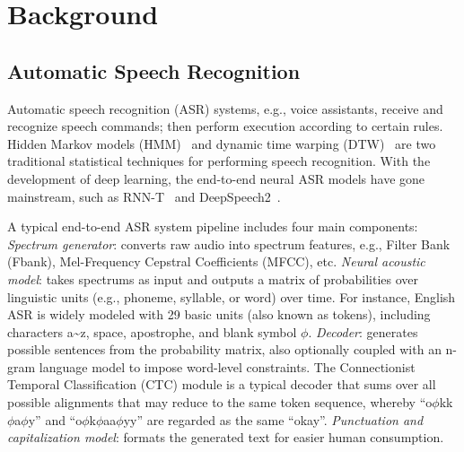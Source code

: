 
\section{Background}
\subsection{Automatic Speech Recognition}\label{background_ASR}
Automatic speech recognition (ASR) systems, e.g., voice assistants, receive and recognize speech commands; then perform execution according to certain rules. 
Hidden Markov models (HMM)~\cite{baum1966statistical} and dynamic time warping (DTW)~\cite{berndt1994using} are two traditional statistical techniques for performing speech recognition.
With the development of deep learning, the end-to-end neural ASR models have gone mainstream, such as RNN-T~\cite{graves2012sequence} and DeepSpeech2~\cite{amodei2016deep}. 

A typical end-to-end ASR system pipeline includes four main components:  \textit{Spectrum generator}: converts raw audio into spectrum features, e.g., Filter Bank (Fbank), Mel-Frequency Cepstral Coefficients (MFCC), etc.  \textit{Neural acoustic model}: takes spectrums as input and outputs a matrix of probabilities over linguistic units (e.g., phoneme, syllable, or word) over time. For instance, English ASR is widely modeled with 29 basic units (also known as tokens), including characters a\textasciitilde z, space, apostrophe, and blank symbol $\phi$.  \textit{Decoder}: generates possible sentences from the probability matrix, also optionally coupled with an n-gram language model to impose word-level constraints. The Connectionist Temporal Classification (CTC) module is a typical decoder that sums over all possible alignments that may reduce to the same token sequence, whereby ``o$\phi$kk$\phi$a$\phi$y'' and ``o$\phi$k$\phi$aa$\phi$yy'' are regarded as the same ``okay''.  \textit{Punctuation and capitalization model}: formats the generated text for easier human consumption.

